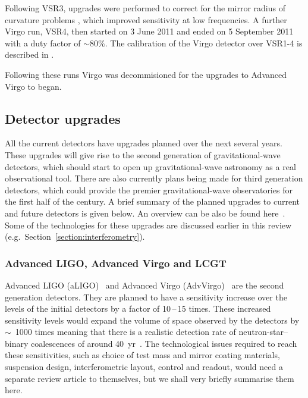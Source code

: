 Following VSR3, upgrades were performed to correct for the mirror radius of curvature problems 
\cite{VSR2paper}, which improved sensitivity at low frequencies. A further Virgo run, VSR4, then started on 3 
June 2011 and ended on 5 September 2011 with a duty factor of $\sim 80\%$. The calibration of the Virgo 
detector over VSR1-4 is described in \cite{2014CQGra..31p5013A}.

Following these runs Virgo was decommisioned for the upgrades to Advanced Virgo to began. 

\subsection{Detector upgrades}


All the current detectors have upgrades planned over the next several years.
These upgrades will give rise to the second generation of gravitational-wave
detectors, which should start to open up gravitational-wave astronomy as a
real observational tool. There are also currently plans being made for third
generation detectors, which could provide the premier gravitational-wave
observatories for the first half of the century. A brief summary of the planned
upgrades to current and future detectors is given below. An overview can be also
be found here~\cite{Whitcomb:2008}. Some of the technologies for these upgrades
are discussed earlier in this review (e.g.\, Section~\ref{section:interferometry}).


\subsubsection{Advanced LIGO, Advanced Virgo and LCGT}
\label{subsection:aligo} 

Advanced LIGO (aLIGO)~\cite{Harry:2010, AdvLIGO, AdvLIGOweb} and Advanced Virgo
(AdvVirgo)~\cite{AdvVirgoDesign, AdvVirgoweb} are the second generation
detectors. They are planned to have a sensitivity increase over the levels of
the initial detectors by a factor of 10\,--\,15 times. These increased sensitivity
levels would expand the volume of space observed by the detectors by $\sim$~1000
times meaning that there is a realistic detection rate of neutron-star--binary
coalescences of around 40~yr~\cite{Abadie:2010e, Kopparapu:2008}.
The technological issues required to reach these sensitivities, such as choice
of test mass and mirror coating materials, suspension design, interferometric
layout, control and readout, would need a separate review article to themselves,
but we shall very briefly summarise them here.


